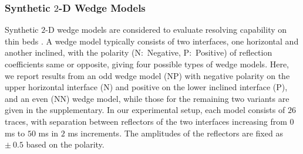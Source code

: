 \documentclass[journal]{IEEEtran}
\begin{document}
\begin{table}[t]
    \centering
    \caption{Performance evaluation in terms of objective metrics averaged over $1000$ test realizations of synthetic $1$-D traces. The proposed {\it Nu}SPAN-$1$ and {\it Nu}SPAN-$2$ show superior amplitude recovery in terms of CC, RRE, and SRER and significantly lower computation time, while {\it Nu}SPAN-$1$ outperforms in support recovery in terms of PES. The best performance is highlighted in \textbf{boldface}. The second best is \underline{underlined}.}
    \label{table:1d_compare}
\end{table}

\subsubsection{Synthetic \texorpdfstring{$2$}{2}-D Wedge Models}
\label{subsubsec:results_wedge}
Synthetic $2$-D wedge models are considered to evaluate resolving capability on thin beds \cite{hamlyn2014thin}. A wedge model typically consists of two interfaces, one horizontal and another inclined, with the polarity (N:~Negative, P:~Positive) of reflection coefficients same or opposite, giving four possible types of wedge models. Here, we report results from an odd wedge model (NP) with negative polarity on the upper horizontal interface (N) and positive on the lower inclined interface (P), and an even (NN) wedge model, while those for the remaining two variants are given in the supplementary. In our experimental setup, each model consists of $26$ traces, with separation between reflectors of the two interfaces increasing from $0$ ms to $50$ ms in $2$ ms increments. The amplitudes of the reflectors are fixed as $\pm~0.5$ based on the polarity. 
\end{document}
